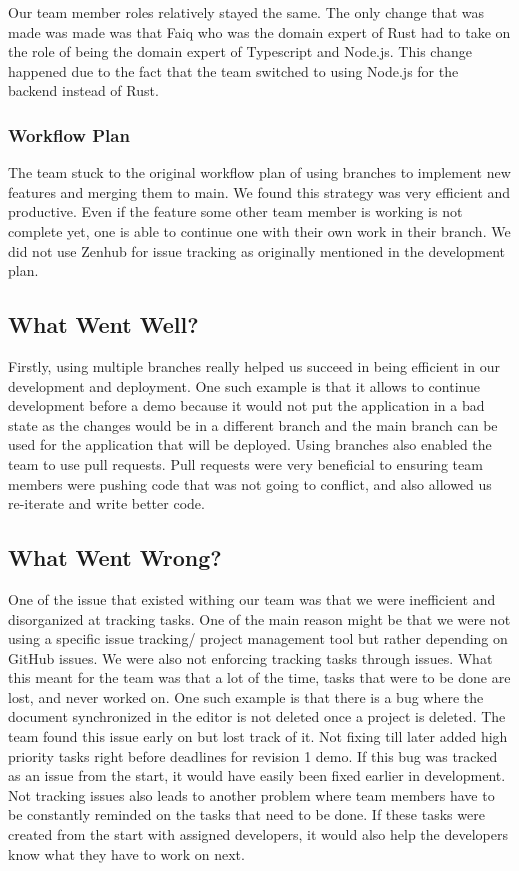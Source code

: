 \documentclass{article}
\begin{document}
	Our team member roles relatively stayed the same. The only change that was made was made was that Faiq who was the domain expert of Rust had to take on the role of being the domain expert of Typescript and Node.js. This change happened due to the fact that the team switched to using Node.js for the backend instead of Rust.\\
	
	\subsubsection{Workflow Plan}
	
	The team stuck to the original workflow plan of using branches to implement new features and merging them to main. We found this strategy was very efficient and productive. Even if the feature some other team member is working is not complete yet, one is able to continue one with their own work in their branch. We did not use Zenhub for issue tracking as originally mentioned in the development plan.
	
	
	\subsection{What Went Well?}
	
	Firstly, using multiple branches really helped us succeed in being efficient in our development and deployment. One such example is that it allows to continue development before a demo because it would not put the application in a bad state as the changes would be in a different branch and the main branch can be used for the application that will be deployed. Using branches also enabled the team to use pull requests. Pull requests were very beneficial to ensuring team members were pushing code that was not going to conflict, and also allowed us re-iterate and write better code.
	
	\subsection{What Went Wrong?}
	
	One of the issue that existed withing our team was that we were inefficient and disorganized at tracking tasks. One of the main reason might be that we were not using a specific issue tracking/ project management tool but rather depending on GitHub issues. We were also not enforcing tracking tasks through issues. What this meant for the team was that a lot of the time, tasks that were to be done are lost, and never worked on. One such example is that there is a bug where the document synchronized in the editor is not deleted once a project is deleted. The team found this issue early on but lost track of it. Not fixing till later added high priority tasks right before deadlines for revision 1 demo. If this bug was tracked as an issue from the start, it would have easily been fixed earlier in development. Not tracking issues also leads to another problem where team members have to be constantly reminded on the tasks that need to be done. If these tasks were created from the start with assigned developers, it would also help the developers know what they have to work on next.
	
\end{document}
